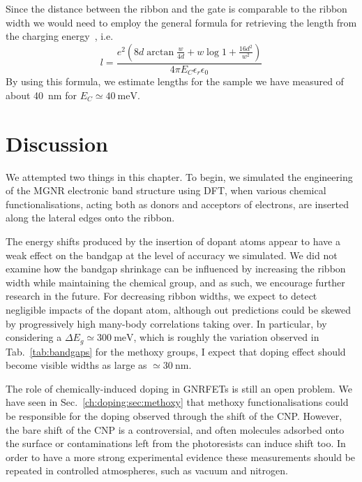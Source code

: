 %
Since the distance between the ribbon and the gate is comparable to the ribbon width we would need to employ the general formula for retrieving the length from the charging energy~\cite{shylau2009capacitance}, i.e.
\begin{equation}
    l = \frac{e^2\left(8 d \arctan{\frac{w}{4 d}}+w \log {1+\frac{16 d^2}{w^2}}\right)}{4\pi E_C \epsilon_r \epsilon_0}
\end{equation}
%
By using this formula, we estimate lengths for the sample we have measured of about \SI{40}{\nano\metre} for $E_C\simeq\SI{40}{\milli\electronvolt}$.




\section{Discussion}\label{gnr-hybrid:sec:summary}

We attempted two things in this chapter. To begin, we simulated the engineering of the \gls{MGNR} electronic band structure using \gls{DFT}, when various chemical functionalisations, acting both as donors and acceptors of electrons, are inserted along the lateral edges onto the ribbon.

The energy shifts produced by the insertion of dopant atoms appear to have a weak effect on the bandgap at the level of accuracy we simulated. We did not examine how the bandgap shrinkage can be influenced by increasing the ribbon width while maintaining the chemical group, and as such, we encourage further research in the future. For decreasing ribbon widths, we expect to detect negligible impacts of the dopant atom, although out predictions could be skewed by progressively high many-body correlations taking over. In particular, by considering a $\Delta E_g\simeq\SI{300}{\milli\electronvolt}$, which is roughly the variation observed in Tab.~\ref{tab:bandgaps} for the methoxy groups, I expect that doping effect should become visible widths as large as $\simeq\SI{30}{\nano\metre}$.

The role of chemically-induced doping in \glspl{GNRFET} is still an open problem. We have seen in Sec.~\ref{ch:doping:sec:methoxy} that methoxy functionalisations could be responsible for the doping observed through the shift of the CNP. However, the bare shift of the CNP is a controversial, and often molecules adsorbed onto the surface or contaminations left from the photoresists can induce shift too.
In order to have a more strong experimental evidence these measurements should be repeated in controlled atmospheres, such as vacuum and nitrogen.

